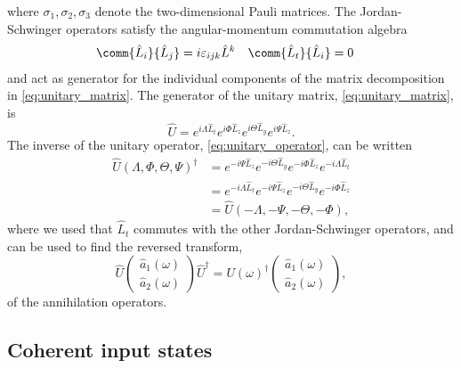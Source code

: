 where $\sigma_1,\sigma_2,\sigma_3$ denote the two-dimensional Pauli matrices.
The Jordan-Schwinger operators satisfy the angular-momentum commutation algebra~\cite[p.~97]{Leonhardt2010}
\begin{align}
	\comm{\hat{L}_i}{\hat{L}_j}
	&=
	i\varepsilon_{ijk}\hat{L}^k
	&
	\comm{\hat{L}_t}{\hat{L}_i}
	&=
	0
\end{align}
and act as generator for the individual components of the matrix decomposition in \cref{eq:unitary_matrix}.
The generator of the unitary matrix, \cref{eq:unitary_matrix}, is
\begin{equation}
	\hat{U}
	=
	e^{i\Lambda\hat{L}_t}
	e^{i\Phi\hat{L}_z}
	e^{i\Theta\hat{L}_y}
	e^{i\Psi\hat{L}_z}
	\label{eq:unitary_operator}
	.
\end{equation}
The inverse of the unitary operator, \cref{eq:unitary_operator}, can be written
\begin{equation}
	\begin{split}
		\hat{U}(\Lambda,\Phi,\Theta,\Psi)^\dagger
		&=
		e^{-i\Psi\hat{L}_z}
		e^{-i\Theta\hat{L}_y}
		e^{-i\Phi\hat{L}_z}
		e^{-i\Lambda\hat{L}_t}
		\\
		&=
		e^{-i\Lambda\hat{L}_t}
		e^{-i\Psi\hat{L}_z}
		e^{-i\Theta\hat{L}_y}
		e^{-i\Phi\hat{L}_z}
		\\
		&=
		\hat{U}(-\Lambda,-\Psi,-\Theta,-\Phi)
		,
	\end{split}
	\label{eq:unitary_operator_inverse}
\end{equation}
where we used that $\hat{L}_t$ commutes with the other Jordan-Schwinger operators, and can be used to find the reversed transform,
\begin{equation}
	\hat{U}
	\begin{pmatrix}
		\hat{a}_1(\omega) \\
		\hat{a}_2(\omega)
	\end{pmatrix}
	\hat{U}^\dagger
	=
	U(\omega)^\dagger
	\begin{pmatrix}
		\hat{a}_1(\omega) \\
		\hat{a}_2(\omega)
	\end{pmatrix}
	\label{eq:unitary_matrix_operator_reverse}
	,
\end{equation}
 of the annihilation operators.

\subsection{Coherent input states}

